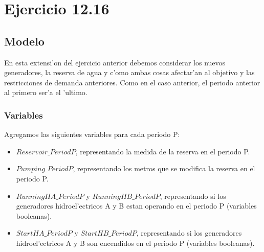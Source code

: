 \section{Ejercicio 12.16}
\subsection{Modelo}
En esta extensi'on del ejercicio anterior debemos considerar los nuevos generadores, la reserva de agua y c'omo ambas cosas afectar'an al objetivo y las restricciones de demanda anteriores. Como en el caso anterior, el periodo anterior al primero ser'a el 'ultimo.
\subsubsection{Variables}
Agregamos las siguientes variables para cada periodo P:
\begin{itemize}
\item $Reservoir\_PeriodP$, representando la medida de la reserva en el periodo P.
\item $Pumping\_PeriodP$, representando los metros que se modifica la reserva en el periodo P.
\item $RunningHA\_PeriodP$ y $RunningHB\_PeriodP$, representando si los generadores hidroel'ectricos A y B estan operando en el periodo P (variables booleanas).
\item $StartHA\_PeriodP$ y $StartHB\_PeriodP$, representando si los generadores hidroel'ectricos A y B son encendidos en el periodo P (variables booleanas).
\end{itemize}
